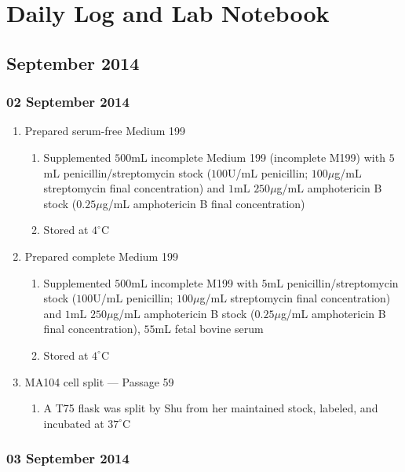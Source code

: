 
\chapter{Daily Log and Lab Notebook}

\section{September 2014}

\subsection*{02 September 2014}

\begin{enumerate}
	\item Prepared serum-free Medium 199
		\begin{enumerate}
			\item Supplemented $500$mL incomplete Medium 199 (incomplete M199) with $5$mL penicillin/streptomycin stock ($100$U/mL penicillin; $100\mu$g/mL streptomycin final concentration) and $1$mL $250\mu$g/mL amphotericin B stock ($0.25\mu$g/mL amphotericin B final concentration)
			\item Stored at $4^{\circ}$C
		\end{enumerate}
	\item Prepared complete Medium 199
		\begin{enumerate}
				\item Supplemented $500$mL incomplete M199 with $5$mL penicillin/streptomycin stock ($100$U/mL penicillin; $100\mu$g/mL streptomycin final concentration) and $1$mL $250\mu$g/mL amphotericin B stock ($0.25\mu$g/mL amphotericin B final concentration), $55$mL fetal bovine serum
				\item Stored at $4^{\circ}$C
		\end{enumerate}
	\item MA104 cell split --- Passage 59
		\begin{enumerate}
			\item A T75 flask was split by Shu from her maintained stock, labeled, and incubated at $37^{\circ}$C
		\end{enumerate}
\end{enumerate}

\subsection*{03 September 2014}

